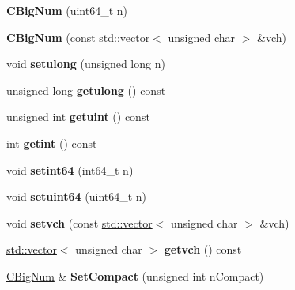 \begin{DoxyCompactItemize}
\item 
\mbox{\label{class_c_big_num_af4cfba2743d8366f355573b75c75e7ef}} 
{\bfseries C\+Big\+Num} (uint64\+\_\+t n)
\item 
\mbox{\label{class_c_big_num_ad3c2843e6755a612b8734eb6e0f03ced}} 
{\bfseries C\+Big\+Num} (const \mbox{\hyperlink{classstd_1_1vector}{std\+::vector}}$<$ unsigned char $>$ \&vch)
\item 
\mbox{\label{class_c_big_num_ac8c00c696d9cbd3fa309a2d0a6bc4b1d}} 
void {\bfseries setulong} (unsigned long n)
\item 
\mbox{\label{class_c_big_num_a035dfd4984c0dfb5400e83afa11e0d21}} 
unsigned long {\bfseries getulong} () const
\item 
\mbox{\label{class_c_big_num_a50e032d16c3d6a4c7a12e21b55ef8ae5}} 
unsigned int {\bfseries getuint} () const
\item 
\mbox{\label{class_c_big_num_afc4744c69da2e73b6e6a8941abf6d244}} 
int {\bfseries getint} () const
\item 
\mbox{\label{class_c_big_num_a9658fb91853022de403e7f08030e6300}} 
void {\bfseries setint64} (int64\+\_\+t n)
\item 
\mbox{\label{class_c_big_num_ae61a86bfe3b286a2cfda45ffba1c1310}} 
void {\bfseries setuint64} (uint64\+\_\+t n)
\item 
\mbox{\label{class_c_big_num_aa9236c14e34519e9b173a9a4b80f5621}} 
void {\bfseries setvch} (const \mbox{\hyperlink{classstd_1_1vector}{std\+::vector}}$<$ unsigned char $>$ \&vch)
\item 
\mbox{\label{class_c_big_num_a305a57111c97172c76a6145ec840bd74}} 
\mbox{\hyperlink{classstd_1_1vector}{std\+::vector}}$<$ unsigned char $>$ {\bfseries getvch} () const
\item 
\mbox{\label{class_c_big_num_a27e3ca82a40ae0c34ac4c059e4d0d66c}} 
\mbox{\hyperlink{class_c_big_num}{C\+Big\+Num}} \& {\bfseries Set\+Compact} (unsigned int n\+Compact)

\end{DoxyCompactItemize}
